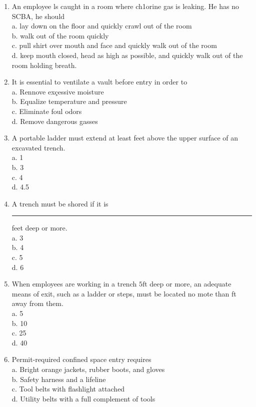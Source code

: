 \begin{enumerate}[1.]
\item An employee ls caught in a room where ch1orine gas is leaking.  He has no SCBA, he should\\
a.	lay down on the floor and quickly crawl out of the room \\
b.	walk out of the room quickly\\
c.	pull shirt over mouth and face and quickly walk out of the room\\
d.	keep mouth closed, head as high as possible, and quickly walk out of the room holding breath.\\

\item It is essential to ventilate a vault before entry in order to\\
a. Rennove exçessive moisture\\
b. Equalize temperature and pressure\\
c. Eliminate foul odors\\
d. Remove dangerous gasses\\

\item A portable ladder must extend at least feet above the upper surface of an excavated trench.\\
a. 1\\
b. 3\\
c. 4\\
d. 4.5\\

\item A trench must be shored if it is \rule{1.5cm}{0.5mm} feet deep or more.\\
a. 3\\
b. 4\\
c. 5\\
d. 6\\

\item When employees are working in a trench $5 \mathrm{ft}$ deep or more, an adequate means of exit, such as a ladder or steps, must be located no mote than ft away from them.\\
a. 5\\
b. 10\\
c. 25\\
d. 40\\


\item Permit-required confined space entry requires\\
a. Bright orange jackets, rubber boots, and gloves\\
b. Safety harness and a lifeline\\
c. Tool belts with flashlight attached\\
d. Utility belts with a full complement of tools\\

\end{enumerate}


